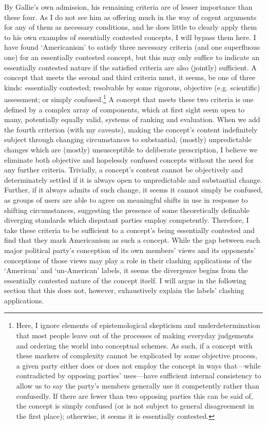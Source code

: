 By Gallie's own admission, his remaining criteria are of lesser
importance than these four. As I do not see him as offering much in the
way of cogent arguments for any of them as necessary conditions, and he
does little to clearly apply them to his own examples of essentially
contested concepts, I will bypass them here. I have found `Americanism'
to satisfy three necessary criteria (and one superfluous one) for an
essentially contested concept, but this may only suffice to indicate an
essentially contested nature if the satisfied criteria are also
(jointly) sufficient. A concept that meets the second and third criteria
must, it seems, be one of three kinds: essentially contested; resolvable
by some rigorous, objective (e.g. scientific) assessment; or simply
confused.\footnote{Here, I ignore elements of epistemological skepticism
  and underdetermination that most people leave out of the processes of
  making everyday judgements and ordering the world into conceptual
  schemes. As such, if a concept with these markers of complexity cannot
  be explicated by some objective process, a given party either does or
  does not employ the concept in ways that---while contradicted by
  opposing parties' uses---have sufficient internal consistency to allow
  us to say the party's members generally use it competently rather than
  confusedly. If there are fewer than two opposing parties this can be
  said of, the concept is simply confused (or is not subject to general
  disagreement in the first place); otherwise, it seems it is
  essentially contested.} A concept that meets these two criteria is one
defined by a complex array of components, which at first sight seem open
to many, potentially equally valid, systems of ranking and evaluation.
When we add the fourth criterion (with my caveats), making the concept's
content indefinitely subject through changing circumstances to
substantial, (mostly) unpredictable changes which are (mostly)
unsusceptible to deliberate prescription, I believe we eliminate both
objective and hopelessly confused concepts without the need for any
further criteria. Trivially, a concept's content cannot be objectively
and determinately settled if it is always open to unpredictable and
substantial change. Further, if it always admits of such change, it
seems it cannot simply be confused, as groups of users are able to agree
on meaningful shifts in use in response to shifting circumstances,
suggesting the presence of some theoretically definable diverging
standards which disputant parties employ competently. Therefore, I take
these criteria to be sufficient to a concept's being essentially
contested and find that they mark Americanism as such a concept. While
the gap between each major political party's conception of its own
members' views and its opponents' conceptions of those views may play a
role in their clashing applications of the `American' and `un-American'
labels, it seems the divergence begins from the essentially contested
nature of the concept itself. I will argue in the following section that
this does not, however, exhaustively explain the labels' clashing
applications.

